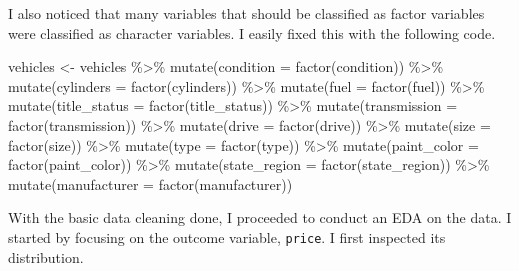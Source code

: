 \documentclass[
]{article}
\newenvironment{Shaded}{\begin{snugshade}}{\end{snugshade}}
\newcommand{\AttributeTok}[1]{\textcolor[rgb]{0.77,0.63,0.00}{#1}}
\newcommand{\FunctionTok}[1]{\textcolor[rgb]{0.00,0.00,0.00}{#1}}
\newcommand{\NormalTok}[1]{#1}
\newcommand{\OtherTok}[1]{\textcolor[rgb]{0.56,0.35,0.01}{#1}}
\newcommand{\SpecialCharTok}[1]{\textcolor[rgb]{0.00,0.00,0.00}{#1}}
\begin{document}
I also noticed that many variables that should be classified as factor
variables were classified as character variables. I easily fixed this
with the following code.

\begin{Shaded}
\begin{Highlighting}[]
\NormalTok{vehicles }\OtherTok{\textless{}{-}}\NormalTok{ vehicles }\SpecialCharTok{\%\textgreater{}\%} 
  \FunctionTok{mutate}\NormalTok{(}\AttributeTok{condition =} \FunctionTok{factor}\NormalTok{(condition)) }\SpecialCharTok{\%\textgreater{}\%} 
  \FunctionTok{mutate}\NormalTok{(}\AttributeTok{cylinders =} \FunctionTok{factor}\NormalTok{(cylinders)) }\SpecialCharTok{\%\textgreater{}\%} 
  \FunctionTok{mutate}\NormalTok{(}\AttributeTok{fuel =} \FunctionTok{factor}\NormalTok{(fuel)) }\SpecialCharTok{\%\textgreater{}\%} 
  \FunctionTok{mutate}\NormalTok{(}\AttributeTok{title\_status =} \FunctionTok{factor}\NormalTok{(title\_status)) }\SpecialCharTok{\%\textgreater{}\%} 
  \FunctionTok{mutate}\NormalTok{(}\AttributeTok{transmission =} \FunctionTok{factor}\NormalTok{(transmission)) }\SpecialCharTok{\%\textgreater{}\%} 
  \FunctionTok{mutate}\NormalTok{(}\AttributeTok{drive =} \FunctionTok{factor}\NormalTok{(drive)) }\SpecialCharTok{\%\textgreater{}\%} 
  \FunctionTok{mutate}\NormalTok{(}\AttributeTok{size =} \FunctionTok{factor}\NormalTok{(size)) }\SpecialCharTok{\%\textgreater{}\%} 
  \FunctionTok{mutate}\NormalTok{(}\AttributeTok{type =} \FunctionTok{factor}\NormalTok{(type)) }\SpecialCharTok{\%\textgreater{}\%} 
  \FunctionTok{mutate}\NormalTok{(}\AttributeTok{paint\_color =} \FunctionTok{factor}\NormalTok{(paint\_color)) }\SpecialCharTok{\%\textgreater{}\%} 
  \FunctionTok{mutate}\NormalTok{(}\AttributeTok{state\_region =} \FunctionTok{factor}\NormalTok{(state\_region)) }\SpecialCharTok{\%\textgreater{}\%} 
  \FunctionTok{mutate}\NormalTok{(}\AttributeTok{manufacturer =} \FunctionTok{factor}\NormalTok{(manufacturer))}
\end{Highlighting}
\end{Shaded}

With the basic data cleaning done, I proceeded to conduct an EDA on the
data. I started by focusing on the outcome variable, \texttt{price}. I
first inspected its distribution.
\end{document}
